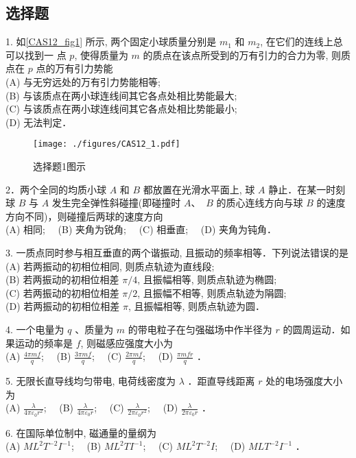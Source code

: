 \subsection{选择题}
1. 如\autoref{CAS12_fig1} 所示, 两个固定小球质量分别是 $m_{1}$ 和 $m_{2}$, 在它们的连线上总可以找到一
点 $p$, 使得质量为 $m$ 的质点在该点所受到的万有引力的合力为零, 则质点在 $p$
点的万有引力势能\\
(A) 与无穷远处的万有引力势能相等;\\
(B) 与该质点在两小球连线间其它各点处相比势能最大;\\
(C) 与该质点在两小球连线间其它各点处相比势能最小;\\
(D) 无法判定．
\begin{figure}[ht]
\centering
\texttt{[image: ./figures/CAS12\_1.pdf]}
\caption{选择题1图示} \label{CAS12_fig1}
\end{figure}
2．两个全同的均质小球 ${A}$ 和 ${B}$ 都放置在光滑水平面上, 球 ${A}$ 静止．在某一时刻球 ${B}$ 与 ${A}$ 发生完全弹性斜碰撞(即碰撞时 ${A}$、 ${~B}$ 的质心连线方向与球 ${B}$ 的速度方向不同)，则碰撞后两球的速度方向\\
(A) 相同;$\quad$
(B) 夹角为锐角;$\quad$
(C) 相垂直;$\quad$
(D) 夹角为钝角．

3. 一质点同时参与相互垂直的两个谐振动, 且振动的频率相等．下列说法错误的是\\
(A) 若两振动的初相位相同, 则质点轨迹为直线段;\\
(B) 若两振动的初相位相差 $\pi / 4$, 且振幅相等, 则质点轨迹为椭圆;\\
(C) 若两振动的初相位相差 $\pi / 2$, 且振幅不相等, 则质点轨迹为䧎圆;\\
(D) 若两振动的初相位相差 $\pi$, 且振幅相等, 则质点轨迹为圆．

4. 一个电量为 $q$ 、质量为 $m$ 的带电粒子在匀强磁场中作半径为 $r$ 的圆周运动．如果运动的频率是 $f$, 则磁感应强度大小为\\
(A) $\frac{4 \pi m f}{q}$;$\quad$
(B) $\frac{3 \pi m f}{q}$;$\quad$
(C) $\frac{2 \pi m f}{q}$;$\quad$
(D) $\frac{\pi m f r}{q}$ ．

5. 无限长直导线均匀带电, 电荷线密度为 $\lambda$ ．距直导线距离 $r$ 处的电场强度大小为\\
(A) $\frac{\lambda}{4 \pi \varepsilon_{0} r^{2}}$;$\quad$
(B) $\frac{\lambda}{4 \pi \varepsilon_{0} r}$;$\quad$
(C) $\frac{\lambda}{2 \pi \varepsilon_{0} r^{2}}$;$\quad$
(D) $\frac{\lambda}{2 \pi \varepsilon_{0} r}$ ．

6. 在国际单位制中, 磁通量的量纲为\\
(A) $M L^{2} T^{-2} I^{-1}$;$\quad$
(B) $M L^{2} T I^{-1}$;$\quad$
(C) $M L^{2} T^{-2} I$;$\quad$
(D) $M L T^{-2} I^{-1}$ ．

